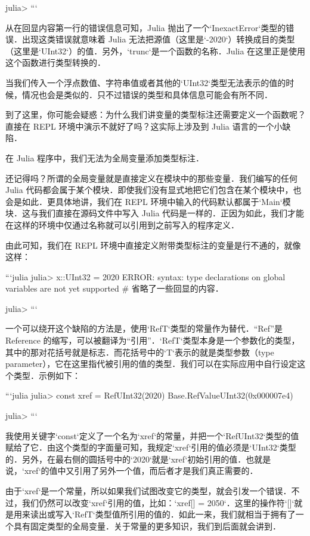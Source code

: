 julia>  
```

从在回显内容第一行的错误信息可知，Julia 抛出了一个`InexactError`类型的错误．出现这类错误就意味着 Julia 无法把源值（这里是`-2020`）转换成目的类型（这里是`UInt32`）的值．另外，`trunc`是一个函数的名称．Julia 在这里正是使用这个函数进行类型转换的．

当我们传入一个浮点数值、字符串值或者其他的`UInt32`类型无法表示的值的时候，情况也会是类似的．只不过错误的类型和具体信息可能会有所不同．

到了这里，你可能会疑惑：为什么我们讲变量的类型标注还需要定义一个函数呢？直接在 REPL 环境中演示不就好了吗？这实际上涉及到 Julia 语言的一个小缺陷．

在 Julia 程序中，我们无法为全局变量添加类型标注．

还记得吗？所谓的全局变量就是直接定义在模块中的那些变量．我们编写的任何 Julia 代码都会属于某个模块．即使我们没有显式地把它们包含在某个模块中，也会是如此．更具体地讲，我们在 REPL 环境中输入的代码默认都属于`Main`模块．这与我们直接在源码文件中写入 Julia 代码是一样的．正因为如此，我们才能在这样的环境中仅通过名称就可以引用到之前写入的程序定义．

由此可知，我们在 REPL 环境中直接定义附带类型标注的变量是行不通的，就像这样：

```julia
julia> x::UInt32 = 2020
ERROR: syntax: type declarations on global variables are not yet supported
# 省略了一些回显的内容．

julia> 
```

一个可以绕开这个缺陷的方法是，使用`Ref{T}`类型的常量作为替代．“Ref”是 Reference 的缩写，可以被翻译为“引用”．`Ref{T}`类型本身是一个参数化的类型，其中的那对花括号就是标志．而花括号中的`T`表示的就是类型参数（type parameter），它在这里指代被引用的值的类型．我们可以在实际应用中自行设定这个类型．示例如下：

```julia
julia> const xref = Ref{UInt32}(2020)
Base.RefValue{UInt32}(0x000007e4)

julia> 
```

我使用关键字`const`定义了一个名为`xref`的常量，并把一个`Ref{UInt32}`类型的值赋给了它．由这个类型的字面量可知，我规定`xref`引用的值必须是`UInt32`类型的．另外，在最右侧的圆括号中的`2020`就是`xref`初始引用的值．也就是说，`xref`的值中又引用了另外一个值，而后者才是我们真正需要的．

由于`xref`是一个常量，所以如果我们试图改变它的类型，就会引发一个错误．不过，我们仍然可以改变`xref`引用的值，比如：`xref[] = 2050`．这里的操作符`[]`就是用来读出或写入`Ref{T}`类型值所引用的值的．如此一来，我们就相当于拥有了一个具有固定类型的全局变量．关于常量的更多知识，我们到后面就会讲到．

